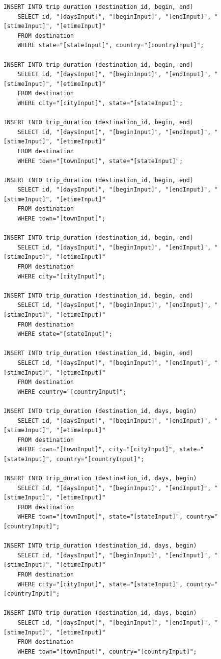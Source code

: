 \documentclass[letterpaper,10pt,onecolumn,compsoc]{IEEEtran}
\begin{document}
\begin{verbatim}
INSERT INTO trip_duration (destination_id, begin, end) 
	SELECT id, "[daysInput]", "[beginInput]", "[endInput]", "[stimeInput]", "[etimeInput]" 
	FROM destination 
	WHERE state="[stateInput]", country="[countryInput]";
	
INSERT INTO trip_duration (destination_id, begin, end) 
	SELECT id, "[daysInput]", "[beginInput]", "[endInput]", "[stimeInput]", "[etimeInput]" 
	FROM destination 
	WHERE city="[cityInput]", state="[stateInput]";
	
INSERT INTO trip_duration (destination_id, begin, end) 
	SELECT id, "[daysInput]", "[beginInput]", "[endInput]", "[stimeInput]", "[etimeInput]" 
	FROM destination 
	WHERE town="[townInput]", state="[stateInput]";
	
INSERT INTO trip_duration (destination_id, begin, end) 
	SELECT id, "[daysInput]", "[beginInput]", "[endInput]", "[stimeInput]", "[etimeInput]" 
	FROM destination 
	WHERE town="[townInput]";
	
INSERT INTO trip_duration (destination_id, begin, end) 
	SELECT id, "[daysInput]", "[beginInput]", "[endInput]", "[stimeInput]", "[etimeInput]" 
	FROM destination 
	WHERE city="[cityInput]";
	
INSERT INTO trip_duration (destination_id, begin, end) 
	SELECT id, "[daysInput]", "[beginInput]", "[endInput]", "[stimeInput]", "[etimeInput]" 
	FROM destination 
	WHERE state="[stateInput]";
	
INSERT INTO trip_duration (destination_id, begin, end) 
	SELECT id, "[daysInput]", "[beginInput]", "[endInput]", "[stimeInput]", "[etimeInput]" 
	FROM destination 
	WHERE country="[countryInput]";
	
INSERT INTO trip_duration (destination_id, days, begin) 
	SELECT id, "[daysInput]", "[beginInput]", "[endInput]", "[stimeInput]", "[etimeInput]" 
	FROM destination 
	WHERE town="[townInput]", city="[cityInput]", state="[stateInput]", country="[countryInput]";
	
INSERT INTO trip_duration (destination_id, days, begin) 
	SELECT id, "[daysInput]", "[beginInput]", "[endInput]", "[stimeInput]", "[etimeInput]" 
	FROM destination 
	WHERE town="[townInput]", state="[stateInput]", country="[countryInput]";
	
INSERT INTO trip_duration (destination_id, days, begin) 
	SELECT id, "[daysInput]", "[beginInput]", "[endInput]", "[stimeInput]", "[etimeInput]" 
	FROM destination 
	WHERE city="[cityInput]", state="[stateInput]", country="[countryInput]";
	
INSERT INTO trip_duration (destination_id, days, begin) 
	SELECT id, "[daysInput]", "[beginInput]", "[endInput]", "[stimeInput]", "[etimeInput]" 
	FROM destination 
	WHERE town="[townInput]", country="[countryInput]";
	

\end{verbatim}
\end{document}
